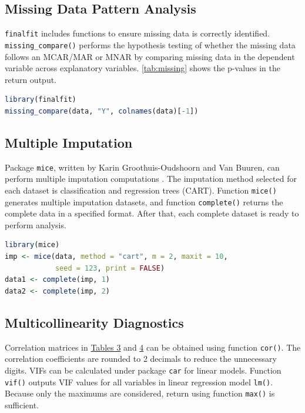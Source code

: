 \documentclass[11pt]{article}
\begin{document}
\subsection{Missing Data Pattern Analysis}
\texttt{finalfit} includes functions to ensure missing data is correctly identified. \texttt{missing\_compare()} performs the hypothesis testing of whether the missing data follows an MCAR/MAR or MNAR by comparing missing data in the dependent variable across explanatory variables. \autoref{tab:missing} shows the p-values in the return output. 
\begin{file}[project.r]
\begin{lstlisting}[language = R]
library(finalfit)
missing_compare(data, "Y", colnames(data)[-1])
\end{lstlisting}
\end{file}



\subsection{Multiple Imputation}
Package \texttt{mice}, written by Karin Groothuis-Oudshoorn and Van Buuren, can perform multiple imputation computations \cite{bk:buuren}. The imputation method selected for each dataset is classification and regression trees (CART). Function \texttt{mice()} generates multiple imputation datasets, and function \texttt{complete()} returns the complete data in a specified format. After that, each complete dataset is ready to perform analysis. 
\begin{file}[project.r]
\begin{lstlisting}[language = R]
library(mice)
imp <- mice(data, method = "cart", m = 2, maxit = 10,
            seed = 123, print = FALSE)
data1 <- complete(imp, 1)
data2 <- complete(imp, 2)
\end{lstlisting}
\end{file}

\subsection{Multicollinearity Diagnostics}
Correlation matrices in \hyperref[tab:cormat1]{Tables 3} and \hyperref[tab:cormat2]{4} can be obtained using function \texttt{cor()}. The correlation coefficients are rounded to 2 decimals to reduce the unnecessary digits. VIFs can be calculated under package \texttt{car} for linear models. Function \texttt{vif()} outputs VIF values for all variables in linear regression model \texttt{lm()}. Because only the maximums are considered, return using function \texttt{max()} is sufficient.
\end{document}
